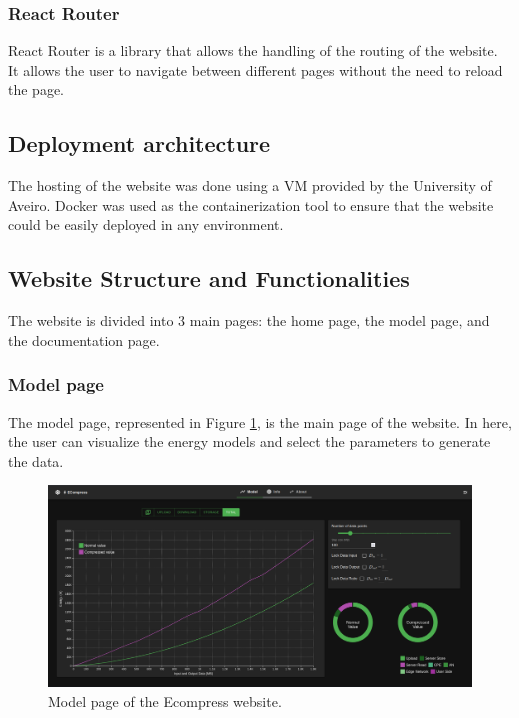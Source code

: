     \subsubsection{React Router}

        React Router is a library that allows the handling of the routing of the website. It allows the user to navigate between different pages without the need to reload the page.

\subsection{Deployment architecture}

    The hosting of the website was done using a \ac{VM} provided by the University of Aveiro.
    Docker was used as the containerization tool to ensure that the website could be easily deployed in any environment.

\subsection{Website Structure and Functionalities}

    The website is divided into 3 main pages: the home page, the model page, and the documentation page.

    \subsubsection{Model page}

        The model page, represented in Figure \ref{fig:web_model_page}, is the main page of the website. In here, the user can visualize the energy models and select the parameters to generate the data.

        \begin{figure}[H]
            \centering
            \includegraphics[width=1\textwidth]{figs/web_model_page_close.png}
            \caption{Model page of the Ecompress website.}
            \label{fig:web_model_page}
        \end{figure}

